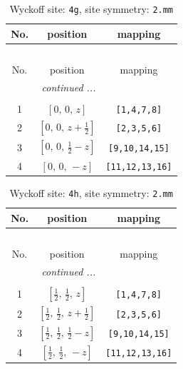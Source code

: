 \documentclass[fleqn,8pt]{jsarticle}
\begin{document}
\renewcommand{\arraystretch}{1.2}
\begin{longtable}{ccc}
\caption{Wyckoff site: {\tt 4g}, site symmetry: {\tt 2.mm}}
 \\
 \hline \hline
No. & position & mapping \\ \hline \endfirsthead

\multicolumn{2}{l}{\tablename\ \thetable{}} \\
 \hline \hline
No. & position & mapping \\ \hline \endhead

 \hline \hline
\multicolumn{2}{r}{\footnotesize\it continued ...} \\ \endfoot

 \hline \hline
\multicolumn{2}{r}{} \\ \endlastfoot

1 & $\left[ 0,\, 0,\, z \right]$ & {\tt [1,4,7,8]} \\ \hline
2 & $\left[ 0,\, 0,\, z + \frac{1}{2} \right]$ & {\tt [2,3,5,6]} \\ \hline
3 & $\left[ 0,\, 0,\, \frac{1}{2} - z \right]$ & {\tt [9,10,14,15]} \\ \hline
4 & $\left[ 0,\, 0,\, - z \right]$ & {\tt [11,12,13,16]} \\
\end{longtable}
\renewcommand{\arraystretch}{1.2}
\begin{longtable}{ccc}
\caption{Wyckoff site: {\tt 4h}, site symmetry: {\tt 2.mm}}
 \\
 \hline \hline
No. & position & mapping \\ \hline \endfirsthead

\multicolumn{2}{l}{\tablename\ \thetable{}} \\
 \hline \hline
No. & position & mapping \\ \hline \endhead

 \hline \hline
\multicolumn{2}{r}{\footnotesize\it continued ...} \\ \endfoot

 \hline \hline
\multicolumn{2}{r}{} \\ \endlastfoot

1 & $\left[ \frac{1}{2},\, \frac{1}{2},\, z \right]$ & {\tt [1,4,7,8]} \\ \hline
2 & $\left[ \frac{1}{2},\, \frac{1}{2},\, z + \frac{1}{2} \right]$ & {\tt [2,3,5,6]} \\ \hline
3 & $\left[ \frac{1}{2},\, \frac{1}{2},\, \frac{1}{2} - z \right]$ & {\tt [9,10,14,15]} \\ \hline
4 & $\left[ \frac{1}{2},\, \frac{1}{2},\, - z \right]$ & {\tt [11,12,13,16]} \\
\end{longtable}
\end{document}
